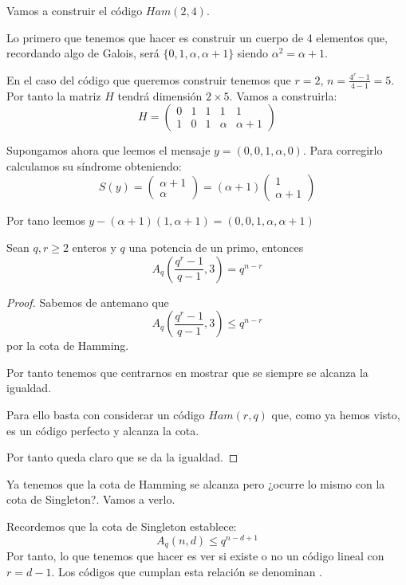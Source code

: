 \begin{example}
Vamos a construir el código $Ham(2,4)$.

Lo primero que tenemos que hacer es construir un cuerpo de 4 elementos que, recordando algo de Galois, será $\{0,1,α,α+1\}$ siendo $α^2=α+1$.

En el caso del código que queremos construir tenemos que $r=2$, $n=\frac{4^r-1}{4-1}=5$. Por tanto la matriz $H$ tendrá dimensión $2 \times 5$. Vamos a construirla:
\[H = \left(\begin{array}{ccccc}
0 & 1 & 1 & 1 & 1\\
1 & 0 & 1 & α & α+1
\end{array} \right)\]

Supongamos ahora que leemos el mensaje $y=(0,0,1,α,0)$. Para corregirlo calculamos su síndrome obteniendo:
\[S(y) =  \left(\begin{array}{c} α+1 \\ α\end{array} \right)=(α+1) \left(\begin{array}{c} 1 \\ α+1\end{array} \right)\]

Por tano leemos $y-(α+1)(1,α+1) = (0,0,1,α,α+1)$
\end{example}

\begin{prop}
Sean $q,r \geq 2$ enteros y $q$ una potencia de un primo, entonces
\[A_q\left(\frac{q^r-1}{q-1},3\right) = q^{n-r}\]
\end{prop}

\begin{proof}
Sabemos de antemano que
\[A_q\left(\frac{q^r-1}{q-1},3\right) \leq q^{n-r}\]
por la cota de Hamming.

Por tanto tenemos que centrarnos en mostrar que se siempre se alcanza la igualdad.

Para ello basta con considerar un código $Ham(r,q)$ que, como ya hemos visto, es un código perfecto y alcanza la cota.

Por tanto queda claro que se da la igualdad.
\end{proof}

Ya tenemos que la cota de Hamming se alcanza pero ¿ocurre lo mismo con la cota de Singleton?. Vamos a verlo.

Recordemos que la cota de Singleton establece:
\[A_q(n,d) \leq q^{n-d+1}\]
Por tanto, lo que tenemos que hacer es ver si existe o no un código lineal con $r=d-1$. Los códigos que cumplan esta relación se denominan .

